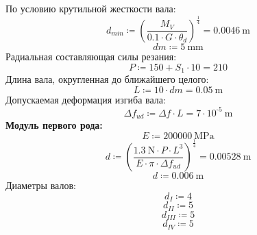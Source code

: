 \documentclass{article}
\newcommand{\defeq}{\coloneq} %
\begin{document}
\colorbox[HTML]{000000}{По условию крутильной жесткости вала:}\newline
\begin{equation*}
d_{min} \defeq \left( \frac{M_{V}}{0.1 \cdot G \cdot θ_{d}} \right)^{\frac{1}{4}} = {0.0046 \: \mathrm{m}}
\end{equation*}
\begin{equation*}
dm \defeq 5 \: \mathrm{mm}
\end{equation*}
\colorbox[HTML]{000000}{Радиальная составляющая силы резания:}\newline
\begin{equation*}
P \defeq 150+\textit{S}_{\textit{1}} \cdot 10 = {210}
\end{equation*}
\colorbox[HTML]{000000}{Длина вала, округленная до ближайшего целого:}\newline
\begin{equation*}
L \defeq 10 \cdot dm = {0.05 \: \mathrm{m}}
\end{equation*}
\colorbox[HTML]{000000}{Допускаемая деформация изгиба вала:}\newline
\begin{equation*}
Δf_{ud} \defeq Δf \cdot L = {7 \cdot 10^{ \operatorname{-} 5} \: \mathrm{m}}
\end{equation*}
\colorbox[HTML]{000000}{\textbf{Модуль первого рода:}}\newline
\begin{equation*}
E \defeq 200000 \: \mathrm{MPa}
\end{equation*}
\begin{equation*}
d \defeq \left( \frac{1.3 \: \mathrm{N} \cdot P \cdot L^{3}}{E \cdot {\pi} \cdot Δf_{ud}} \right)^{\frac{1}{4}} = {0.00528 \: \mathrm{m}}
\end{equation*}
\begin{equation*}
d \defeq 0.006 \: \mathrm{m}
\end{equation*}
\colorbox[HTML]{000000}{Диаметры валов:}\newline
\begin{equation*}
d_{I} \defeq 4
\end{equation*}
\begin{equation*}
d_{II} \defeq 5
\end{equation*}
\begin{equation*}
d_{III} \defeq 5
\end{equation*}
\begin{equation*}
d_{IV} \defeq 5
\end{equation*}
\end{document}
